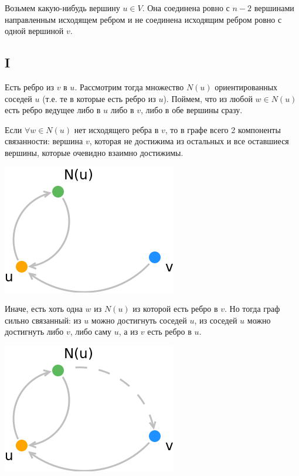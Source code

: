 \documentclass{article}
\begin{document}
	Возьмем какую-нибудь вершину $u \in V$. Она соединена ровно с $n - 2$ вершинами направленным исходящем ребром и не соединена исходящим ребром ровно с одной вершиной $v$.
	
	\subsection{I}
	Есть ребро из $v$ в $u$. Рассмотрим тогда множество $N(u)$ ориентированных соседей $u$ (т.е. те в которые есть ребро из $u$). Поймем, что из любой $w \in N(u)$ есть ребро ведущее либо в $u$ либо в $v$, либо в обе вершины сразу.
	
	Если $\forall w \in N(u)$ нет исходящего ребра в $v$, то в графе всего 2 компоненты связанности: вершина $v$, которая не достижима из остальных и все оставшиеся вершины, которые очевидно взаимно достижимы. 
	\begin{center}
		\includegraphics[scale=0.5]{8_1}
	\end{center}
	
	
	Иначе, есть хоть одна $w$ из $N(u)$ из которой есть ребро в $v$. Но тогда граф сильно связанный: из $u$ можно достигнуть соседей $u$, из соседей $u$ можно достигнуть либо $v$, либо саму $u$, а из $v$ есть ребро в $u$.
	
		\begin{center}
			\includegraphics[scale=0.5]{8_2}
		\end{center}
	
\end{document}
